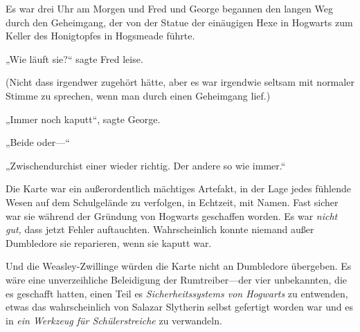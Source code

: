 Es war drei Uhr am Morgen und Fred und George begannen den langen Weg durch den Geheimgang, der von der Statue der einäugigen Hexe in Hogwarts zum Keller des Honigtopfes in Hogsmeade führte.

„Wie läuft sie?“ sagte Fred leise.

(Nicht dass irgendwer zugehört hätte, aber es war irgendwie seltsam mit normaler Stimme zu sprechen, wenn man durch einen Geheimgang lief.)

„Immer noch kaputt“, sagte George.

„Beide oder—“

„Zwischendurchist einer wieder richtig. Der andere so wie immer.“

Die Karte war ein außerordentlich mächtiges Artefakt, in der Lage jedes fühlende Wesen auf dem Schulgelände zu verfolgen, in Echtzeit, mit Namen. Fast sicher war sie während der Gründung von Hogwarts geschaffen worden. Es war \emph{nicht gut,} dass jetzt Fehler auftauchten. Wahrscheinlich konnte niemand außer Dumbledore sie reparieren, wenn sie kaputt war.

Und die Weasley-Zwillinge würden die Karte nicht an Dumbledore übergeben. Es wäre eine unverzeihliche Beleidigung der Rumtreiber—der vier unbekannten, die es geschafft hatten, einen Teil es \emph{Sicherheitssystems von Hogwarts} zu entwenden, etwas das wahrscheinlich von Salazar Slytherin selbst gefertigt worden war und es in \emph{ein Werkzeug für Schülerstreiche} zu verwandeln.

